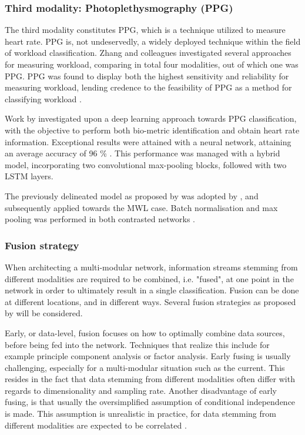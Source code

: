 \documentclass[12pt]{article}
\begin{document}
\subsubsection{Third modality: Photoplethysmography (PPG)}
The third modality constitutes PPG, which is a technique utilized to measure heart rate. PPG is, not undeservedly, a widely deployed technique within the field of workload classification. Zhang and colleagues investigated several approaches for measuring workload, comparing in total four modalities, out of which one was PPG. PPG was found to display both the highest sensitivity and reliability for measuring workload, lending credence to the feasibility of PPG as a method for classifying workload \cite{zhang2018evaluating}. 

Work by  investigated upon a deep learning approach towards PPG classification, with the objective to perform both bio-metric identification and obtain heart rate information. Exceptional results were attained with a neural network, attaining an average accuracy of 96 \% \cite{biswas2019cornet}. This performance was managed with a hybrid model, incorporating two convolutional max-pooling blocks, followed with two LSTM layers. 

The previously delineated model as proposed by  was adopted by , and subsequently applied towards the MWL case. Batch normalisation and max pooling was performed in both contrasted networks \cite{dolmans2020perceived}.   

\subsubsection{Fusion strategy}  
When architecting a multi-modular network, information streams stemming from different modalities are required to be combined, i.e. "fused", at one point in the network in order to ultimately result in a single classification. Fusion can be done at different locations, and in different ways. Several fusion strategies as proposed by  will be considered.

Early, or data-level, fusion focuses on how to optimally combine data sources, before being fed into the network. Techniques that realize this include for example principle component analysis or factor analysis. Early fusing is usually challenging, especially for a multi-modular situation such as the current. This resides in the fact that data stemming from different modalities often differ with regards to dimensionality and sampling rate. Another disadvantage of early fusing, is that usually the oversimplified assumption of conditional independence is made. This assumption is unrealistic in practice, for data stemming from different modalities are expected to be correlated \cite{ramachandram2017deep}. 
\end{document}
